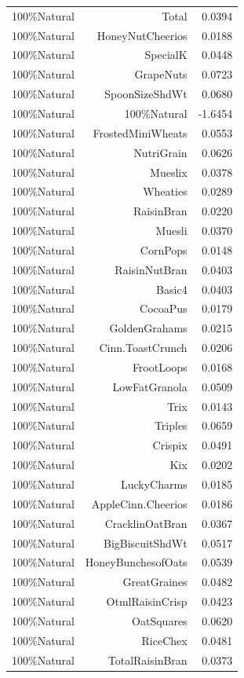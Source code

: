 \begin{longtable}{@{}lrr@{}}
100\%Natural & Total & 0.0394 \\
100\%Natural & HoneyNutCheerios & 0.0188 \\
100\%Natural & SpecialK & 0.0448 \\
100\%Natural & GrapeNuts & 0.0723 \\
100\%Natural & SpoonSizeShdWt & 0.0680 \\
100\%Natural & 100\%Natural & -1.6454 \\
100\%Natural & FrostedMiniWheats & 0.0553 \\
100\%Natural & NutriGrain & 0.0626 \\
100\%Natural & Mueslix & 0.0378 \\
100\%Natural & Wheaties & 0.0289 \\
100\%Natural & RaisinBran & 0.0220 \\
100\%Natural & Muesli & 0.0370 \\
100\%Natural & CornPops & 0.0148 \\
100\%Natural & RaisinNutBran & 0.0403 \\
100\%Natural & Basic4 & 0.0403 \\
100\%Natural & CocoaPus & 0.0179 \\
100\%Natural & GoldenGrahams & 0.0215 \\
100\%Natural & Cinn.ToastCrunch & 0.0206 \\
100\%Natural & FrootLoops & 0.0168 \\
100\%Natural & LowFatGranola & 0.0509 \\
100\%Natural & Trix & 0.0143 \\
100\%Natural & Triples & 0.0659 \\
100\%Natural & Crispix & 0.0491 \\
100\%Natural & Kix & 0.0202 \\
100\%Natural & LuckyCharms & 0.0185 \\
100\%Natural & AppleCinn.Cheerios & 0.0186 \\
100\%Natural & CracklinOatBran & 0.0367 \\
100\%Natural & BigBiscuitShdWt & 0.0517 \\
100\%Natural & HoneyBunchesofOats & 0.0539 \\
100\%Natural & GreatGraines & 0.0482 \\
100\%Natural & OtmlRaisinCrisp & 0.0423 \\
100\%Natural & OatSquares & 0.0620 \\
100\%Natural & RiceChex & 0.0481 \\
100\%Natural & TotalRaisinBran & 0.0373 \\

\end{longtable}
